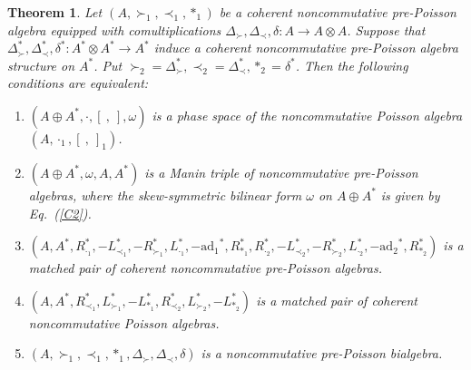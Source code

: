 \documentclass[10pt,a4paper]{amsart}
\newtheorem{thm}{Theorem}
\begin{document}
\begin{thm} \label{Mb3} Let $(A, \succ_1,\prec_1,\ast_1)$ be a coherent noncommutative pre-Poisson algebra
equipped with comultiplications $\Delta_{\succ},\Delta_{\prec},\delta:A\longrightarrow
A\otimes A$. Suppose that $\Delta_{\succ}^{*},\Delta_{\prec}^{*},\delta^{*}:A^{*}\otimes
A^{*}\longrightarrow A^{*}$ induce a coherent noncommutative pre-Poisson algebra structure
on $A^{*}$. Put $\succ_2=\Delta_{\succ}^{*},\prec_2=\Delta_{\prec}^{*},\ast_2=\delta^{*}$. Then the
following conditions are equivalent:
\begin{enumerate}
	\item\label{Ea1} $(A\oplus A^{*},\cdot,[ \ , \ ],\omega)$ is a phase space of the noncommutative Poisson algebra $(A,\cdot_1, [ \ , \ ]_1)$.
\item\label{Ea2} $(A\oplus A^{*},\omega,A,A^{*})$ is a Manin triple of noncommutative pre-Poisson algebras, 
where the skew-symmetric bilinear form $\omega$ on $A\oplus A^{*}$ is given by Eq.~(\ref{C2}).
\item\label{Ea3}
$(A, A^{*}, R_{\cdot_1}^{*},-L_{\prec_1}^{*},-R_{\succ_1}^{*},L_{\cdot_1}^{*},-\mathrm{ad_1}^{*},R^{*}_{\ast_1},
 R_{\cdot_2}^{*},-L_{\prec_2}^{*},-R_{\succ_2}^{*},L_{\cdot_2}^{*},-\mathrm{ad_2}^{*},R^{*}_{\ast_2})$ 
 is a matched pair of coherent noncommutative pre-Poisson algebras.
 \item\label{Ea4}
$(A, A^{*},R_{\prec_1}^{*}, L_{\succ_1}^{*},-L_{\ast_1}^{*},R_{\prec_2}^{*},L_{\succ_2}^{*},-L_{\ast_2}^{*}) $ is a matched pair of coherent 
noncommutative Poisson algebras.
	\item\label{Ea5} $(A, \succ_1,\prec_1,\ast_1,\Delta_{\succ},\Delta_{\prec},\delta)$ is a noncommutative pre-Poisson bialgebra.
\end{enumerate}
\end{thm}
\end{document}
